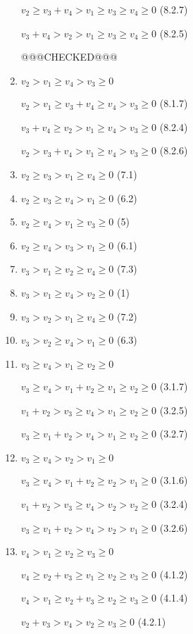 \documentclass{article}
\begin{document}
\begin{enumerate}
    $v_2\geq{v_3+v_4}>v_1\geq{v_3}\geq{v_4}\geq{0}$ (8.2.7)

    $v_3+v_4>{v_2}>v_1\geq{v_3}\geq{v_4}\geq{0}$ (8.2.5)

    @@@CHECKED@@@

    \item $v_2>v_1\geq{v_4}>v_3\geq{0}$

    $v_2>v_1\geq{v_3+v_4}\geq{v_4}>v_3\geq{0}$ (8.1.7)

    $v_3+v_4\geq{v_2}>v_1\geq{v_4}>v_3\geq{0}$ (8.2.4)

    $v_2>v_3+v_4>v_1\geq{v_4}>v_3\geq{0}$ (8.2.6)

    \item $v_2\geq{v_3}>v_1\geq{v_4}\geq{0}$ (7.1)
    \item $v_2\geq{v_3}\geq{v_4}>v_1\geq{0}$ (6.2)
    \item $v_2\geq{v_4}>v_1\geq{v_3}\geq{0}$ (5)
    \item $v_2\geq{v_4}>v_3>v_1\geq{0}$ (6.1)
    \item $v_3>v_1\geq{v_2}\geq{v_4}\geq{0}$ (7.3)
    \item $v_3>v_1\geq{v_4}>v_2\geq{0}$ (1)
    \item $v_3>v_2>v_1\geq{v_4}\geq{0}$ (7.2)
    \item $v_3>v_2\geq{v_4}>v_1\geq{0}$ (6.3)
    \item $v_3\geq{v_4}>v_1\geq{v_2}\geq{0}$

    $v_3\geq{v_4}>v_1+v_2\geq{v_1}\geq{v_2}\geq{0}$ (3.1.7)

    $v_1+v_2>v_3\geq{v_4}>v_1\geq{v_2}\geq{0}$ (3.2.5)

    $v_3\geq{v_1+v_2}>v_4>v_1\geq{v_2}\geq{0}$ (3.2.7)

    \item $v_3\geq{v_4}>v_2>v_1\geq{0}$

    $v_3\geq{v_4}>v_1+v_2\geq{v_2}>v_1\geq{0}$ (3.1.6)

    $v_1+v_2>v_3\geq{v_4}>v_2>v_2\geq{0}$ (3.2.4)

    $v_3\geq{v_1+v_2}>v_4>v_2>v_1\geq{0}$ (3.2.6)

    \item $v_4>v_1\geq{v_2}\geq{v_3}\geq{0}$

    $v_4\geq{v_2+v_3}\geq{v_1}\geq{v_2}\geq{v_3}\geq{0}$ (4.1.2)
    
    $v_4>v_1\geq{v_2+v_3}\geq{v_2}\geq{v_3}\geq{0}$ (4.1.4)
    
    $v_2+v_3>v_4>v_2\geq{v_3}\geq{0}$ (4.2.1)


\end{enumerate}
\end{document}
